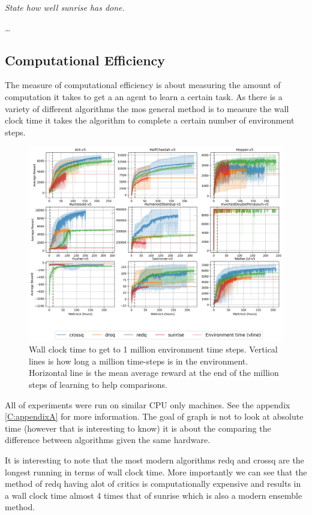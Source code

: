 \textit{State how well sunrise has done.}

\dots

\subsection{Computational Efficiency}

The measure of computational efficiency is about measuring the amount of computation it takes to get a an agent to learn a certain task. As there is a variety of different algorithms the mos general method is to measure the wall clock time it takes the algorithm to complete a certain number of environment steps.

\begin{figure}[H]
    \centering
    \includegraphics[width=1\textwidth]{figures/wall_clock_results.png}
    \caption{Wall clock time to get to 1 million environment time steps. Vertical lines is how long a million time-steps is in the environment. Horizontal line is the mean average reward at the end of the million steps of learning to help comparisons.}
    \label{fig:sample_efficiency}
\end{figure}

All of experiments were run on similar CPU only machines. See the appendix \ref{C:appendixA} for more information. The goal of graph is not to look at absolute time (however that is interesting to know) it is about the comparing the difference between algorithms given the same hardware.

It is interesting to note that the most modern algorithms redq and crossq are the longest running in terms of wall clock time. More importantly we can see that the method of redq having alot of critics is computationally expensive and results in a wall clock time almost 4 times that of sunrise which is also a modern ensemble method.

